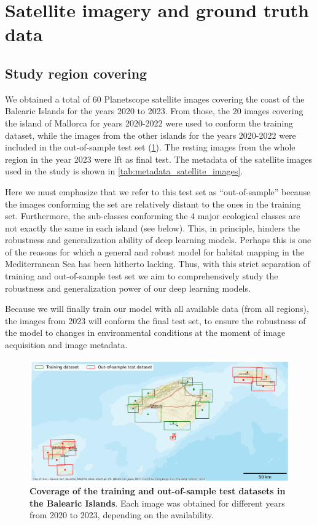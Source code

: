\section{Satellite imagery and ground truth data}\label{app:satellite_imagery}

\subsection{Study region covering}

We obtained a total of 60 Planetscope satellite images covering the
coast of the Balearic Islands for the years 2020 to 2023. From those, the 20
images covering the island of Mallorca for years 2020-2022 were used to conform
the training
dataset, while the images from the other islands for the years 2020-2022 were
included in the
out-of-sample test set (\cref{fig:images-dataset}). The resting images from the
whole region in the year 2023 were lft as final test. The metadata of the
satellite images used in the study is shown in
\cref{tab:metadata_satellite_images}.

Here we must emphasize that we refer to this test set as
``out-of-sample'' because the images conforming the set are relatively distant
to the ones in the training set. Furthermore, the sub-classes conforming the 4
major ecological classes are not exactly the same in each island (see below).
This, in principle, hinders the robustness and generalization ability of deep
learning models. Perhaps this is one of the reasons for which a general and
robust model for habitat mapping in the Mediterranean Sea has been hitherto
lacking. Thus, with this strict separation of training and out-of-sample test
set we aim to comprehensively study the robustness and generalization power of
our deep learning models.

Because we will finally train our model with all available data (from all
regions), the images from 2023 will conform the final test set, to ensure the
robustness of the model to changes in environmental conditions at the moment of
image acquisition and image metadata.

\begin{figure}[H]
    \centering
    \includegraphics[width=\textwidth]{Figures/Images_used.pdf}
    \caption[Coverage of the training and out-of-sample test datasets in
        the Balearic Islands]{\textbf{Coverage of the training and
            out-of-sample
            test datasets in
            the Balearic Islands}. Each image was obtained for different years
        from 2020 to 2023, depending on the availability.}
    \label{fig:images-dataset}
\end{figure}

